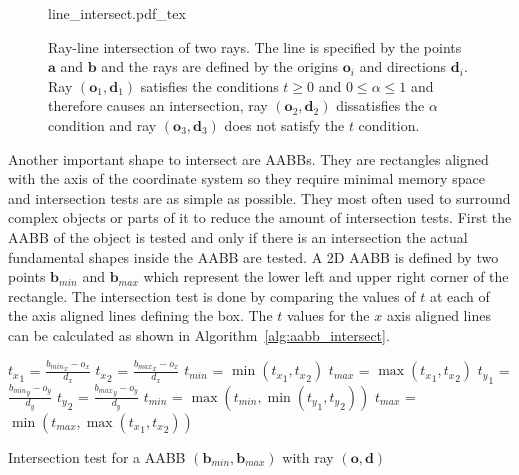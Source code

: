 \documentclass[a4paper,10pt]{article}
\renewcommand{\vec}[1]{\mathbf{#1}}
\newcommand{\algref}[1]{Algorithm~\ref{#1}}
\begin{document}
    \begin{center}
        \begin{figure}
            \centering    
            \def\svgwidth{0.8\textwidth}
            {line_intersect.pdf_tex}
            \caption{
                Ray-line intersection of two rays. The line is specified by
                the points $\vec{a}$ and $\vec{b}$ and the rays are 
                defined by
                the origins $\vec{o}_i$ and directions $\vec{d}_i$.
                Ray $(\vec{o}_1, \vec{d}_1)$ satisfies the conditions 
                $t \geq 0$ and $0 \leq \alpha \leq 1$
                and therefore causes an intersection, ray $(\vec{o}_2, \vec{d}_2)$
                dissatisfies the $\alpha$ condition and ray $(\vec{o}_3, \vec{d}_3)$
                does not satisfy the $t$ condition. 
            }
            \label{fig:line_intersect}
        \end{figure}
    \end{center}

    Another important shape to intersect are AABBs.
    They are rectangles aligned with the axis of the coordinate system
    so they require minimal memory space and intersection tests are
    as simple as possible.
    They most often used to surround complex objects or parts of it
    to reduce the amount of intersection tests.
    First the AABB of the object is tested and only if there is an
    intersection the actual fundamental shapes inside the AABB are tested.
    A 2D AABB is defined by two points $\vec{b}_{min}$ and $\vec{b}_{max}$ which
    represent the lower left and upper right corner of the rectangle.
    The intersection test is done by comparing the values of $t$ at each
    of the axis aligned lines defining the box.
    The $t$ values for the $x$ axis aligned lines can be calculated as
    shown in \algref{alg:aabb_intersect}.

    \begin{algorithm}
        \label{alg:aabb_intersect}
        \SetAlgoLined

        ${t_x}_1$ = $\frac{{b_{min}}_x - o_x}{d_x}$\;
        ${t_x}_2$ = $\frac{{b_{max}}_x - o_x}{d_x}$\;
        $t_{min}$ = $\min({t_x}_1, {t_x}_2)$\;
        $t_{max}$ = $\max({t_x}_1, {t_x}_2)$\;
        ${t_y}_1$ = $\frac{{b_{min}}_y - o_y}{d_y}$\;
        ${t_y}_2$ = $\frac{{b_{max}}_y - o_y}{d_y}$\;
        $t_{min}$ = $\max(t_{min}, \min({t_y}_1, {t_y}_2))$\;
        $t_{max}$ = $\min(t_{max}, \max({t_x}_1, {t_x}_2))$\;

        \caption{
        Intersection test for a AABB $(\vec{b}_{min}, \vec{b}_{max})$
        with ray $(\vec{o}, \vec{d})$
        }
    \end{algorithm}
\end{document}
